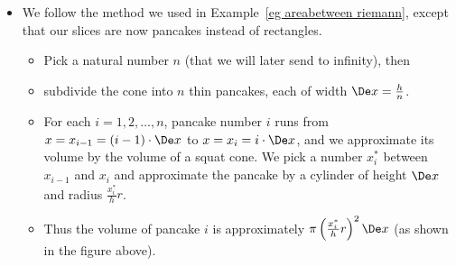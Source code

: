 \begin{eg}[Cone]
\begin{itemize}
\item We follow the method we used in Example~\ref{eg areabetween riemann}, except that
our slices are now pancakes instead of rectangles.
\begin{itemize}
 \item Pick a natural number $n$ (that we will later send to infinity), then
\item subdivide the cone into $n$ thin pancakes, each of width $\De
x=\frac{h}{n}$.
\item For each $i=1,2,\dots,n$, pancake number $i$ runs from
$x=x_{i-1}=(i-1)\cdot\De x$ to $x=x_i=i\cdot\De x$, and we approximate its
volume by the volume of a squat cone. We pick a number $x_i^*$ between $x_{i-1}$ and
$x_i$
and approximate the pancake by a cylinder of height $\De x$ and radius $\frac{x_i^*}{h}r$.
  \item Thus the volume of pancake $i$ is
approximately $\pi \left( \frac{x_i^*}{h}r\right)^2 \De x$ (as shown in the figure above).
\end{itemize}


\end{itemize}
\end{eg}
